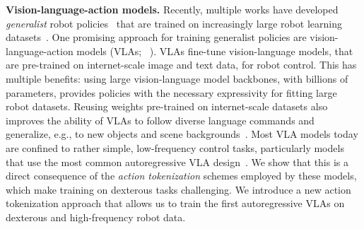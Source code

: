 \noindent\textbf{Vision-language-action models.}
Recently, multiple works have developed \emph{generalist} robot policies~\citep{brohan2022rt,octo_2023,bharadhwaj2023roboagent,rt22023arxiv,Doshi24-crossformer,kim2024openvla,wangscaling,cheang2024gr2generativevideolanguageactionmodel}
that are trained on increasingly large robot learning datasets~\citep{open_x_embodiment_rt_x_2023,khazatsky2024droid,walke2023bridgedata,fang2024rh20t,mandlekar2018roboturk,jiang2024dexmimicgen}. 
One promising approach for training generalist policies are vision-language-action models (VLAs; ~\citep{rt22023arxiv,collaboration2023open,kim2024openvla,Zawalski24-ecot,black2024pi_0,wen2024tinyvlafastdataefficientvisionlanguageaction,zheng2024tracevla,zhen20243d,cheng2024navila,cheang2024gr2generativevideolanguageactionmodel}).
VLAs fine-tune vision-language models, that are pre-trained on internet-scale image and text data, for robot control. This has multiple benefits: using large vision-language model backbones, with billions of parameters, provides policies with the necessary expressivity for fitting large robot datasets. Reusing weights pre-trained on internet-scale datasets also improves the ability of VLAs to follow diverse language commands and generalize, e.g., to new objects and scene backgrounds~\citep{rt22023arxiv,kim2024openvla,Zawalski24-ecot,wen2024tinyvlafastdataefficientvisionlanguageaction,jones2025beyond}. 
Most VLA models today are confined to rather simple, low-frequency control tasks, particularly models that use the most common autoregressive VLA design~\citep{rt22023arxiv, kim2024openvla}. We show that this is a direct consequence of the \emph{action tokenization} schemes employed by these models, which make training on dexterous tasks challenging. We introduce a new action tokenization approach that allows us to train the first autoregressive VLAs on dexterous and high-frequency robot data.

